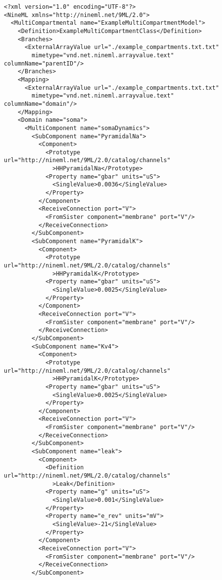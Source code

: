 \documentclass[draftspec]{ninemlspec}
\begin{document}
\begin{lstlisting}
<?xml version="1.0" encoding="UTF-8"?>
<NineML xmlns="http://nineml.net/9ML/2.0">
  <MultiCompartmental name="ExampleMultiCompartmentModel">
    <Definition>ExampleMultiCompartmentClass</Definition>
    <Branches>
      <ExternalArrayValue url="./example_compartments.txt.txt"
        mimetype="vnd.net.nineml.arrayvalue.text" columnName="parentID"/>
    </Branches>
    <Mapping>
      <ExternalArrayValue url="./example_compartments.txt.txt"
        mimetype="vnd.net.nineml.arrayvalue.text" columnName="domain"/>
    </Mapping>
    <Domain name="soma">
      <MultiComponent name="somaDynamics">
        <SubComponent name="PyramidalNa">
          <Component>
            <Prototype url="http://nineml.net/9ML/2.0/catalog/channels"
              >HHPyramidalNa</Prototype>
            <Property name="gbar" units="uS">
              <SingleValue>0.0036</SingleValue>
            </Property>
          </Component>
          <ReceiveConnection port="V">
            <FromSister component="membrane" port="V"/>
          </ReceiveConnection>
        </SubComponent>
        <SubComponent name="PyramidalK">
          <Component>
            <Prototype url="http://nineml.net/9ML/2.0/catalog/channels"
              >HHPyramidalK</Prototype>
            <Property name="gbar" units="uS">
              <SingleValue>0.0025</SingleValue>
            </Property>
          </Component>
          <ReceiveConnection port="V">
            <FromSister component="membrane" port="V"/>
          </ReceiveConnection>
        </SubComponent>
        <SubComponent name="Kv4">
          <Component>
            <Prototype url="http://nineml.net/9ML/2.0/catalog/channels"
              >HHPyramidalK</Prototype>
            <Property name="gbar" units="uS">
              <SingleValue>0.0025</SingleValue>
            </Property>
          </Component>
          <ReceiveConnection port="V">
            <FromSister component="membrane" port="V"/>
          </ReceiveConnection>
        </SubComponent>
        <SubComponent name="leak">
          <Component>
            <Definition url="http://nineml.net/9ML/2.0/catalog/channels"
              >Leak</Definition>
            <Property name="g" units="uS">
              <SingleValue>0.001</SingleValue>
            </Property>
            <Property name="e_rev" units="mV">
              <SingleValue>-21</SingleValue>
            </Property>
          </Component>
          <ReceiveConnection port="V">
            <FromSister component="membrane" port="V"/>
          </ReceiveConnection>
        </SubComponent>

\end{lstlisting}
\end{document}
